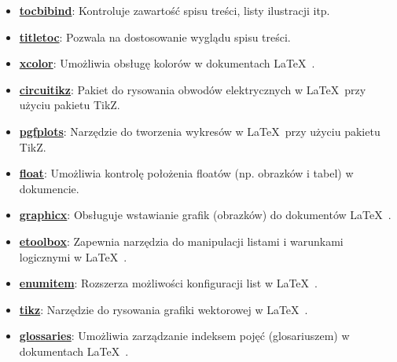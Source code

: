 \begin{itemize}
\item \href{https://www.ctan.org/pkg/tocbibind}{\textbf{tocbibind}}: Kontroluje zawartość spisu treści, listy ilustracji itp.
\item \href{https://www.ctan.org/pkg/titletoc}{\textbf{titletoc}}: Pozwala na dostosowanie wyglądu spisu treści.
\item \href{https://www.ctan.org/pkg/xcolor}{\textbf{xcolor}}: Umożliwia obsługę kolorów w dokumentach \LaTeX\ .
\item \href{https://www.ctan.org/pkg/circuitikz}{\textbf{circuitikz}}: Pakiet do rysowania obwodów elektrycznych w \LaTeX\  przy użyciu pakietu TikZ.
\item \href{https://www.ctan.org/pkg/pgfplots}{\textbf{pgfplots}}: Narzędzie do tworzenia wykresów w \LaTeX\  przy użyciu pakietu TikZ.
\item \href{https://www.ctan.org/pkg/float}{\textbf{float}}: Umożliwia kontrolę położenia floatów (np. obrazków i tabel) w dokumencie.
\item \href{https://www.ctan.org/pkg/graphicx}{\textbf{graphicx}}: Obsługuje wstawianie grafik (obrazków) do dokumentów \LaTeX\ .
\item \href{https://www.ctan.org/pkg/etoolbox}{\textbf{etoolbox}}: Zapewnia narzędzia do manipulacji listami i warunkami logicznymi w \LaTeX\ .
\item \href{https://www.ctan.org/pkg/enumitem}{\textbf{enumitem}}: Rozszerza możliwości konfiguracji list w \LaTeX\ .
\item \href{https://www.ctan.org/pkg/pgf}{\textbf{tikz}}: Narzędzie do rysowania grafiki wektorowej w \LaTeX\ .
\item \href{https://www.ctan.org/pkg/glossaries}{\textbf{glossaries}}: Umożliwia zarządzanie indeksem pojęć (glosariuszem) w dokumentach \LaTeX\ .
\end{itemize}

